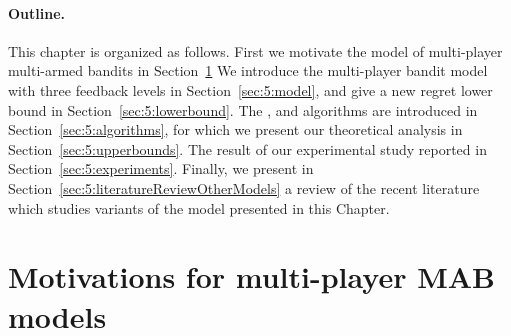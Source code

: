 \paragraph{Outline.}
%
This chapter is organized as follows.
First we motivate the model of multi-player multi-armed bandits in Section~\ref{sec:5:motivation}
We introduce the multi-player bandit model with three feedback levels in Section~\ref{sec:5:model}, and give a new regret lower bound in Section~\ref{sec:5:lowerbound}.
The \RandTopM, \MCTopM{} and \Selfish{} algorithms are introduced in Section~\ref{sec:5:algorithms},
for which we present our theoretical analysis in Section~\ref{sec:5:upperbounds}.
The result of our experimental study reported in Section~\ref{sec:5:experiments}.
Finally, we present in Section~\ref{sec:5:literatureReviewOtherModels} a review of the recent literature which studies variants of the model presented in this Chapter.


\section{Motivations for multi-player MAB models}
\label{sec:5:motivation}






